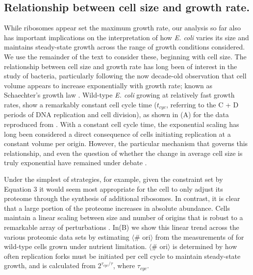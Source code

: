 \subsection{Relationship between cell size and growth rate.}

While ribosomes appear set the maximum growth rate, our analysis so far also has
important implications on the interpretation of how \textit{E. coli} varies its
size and maintains steady-state growth across the range of growth conditions
considered. We use the remainder of the text to consider these, beginning with
cell size.
The relationship between cell size and growth rate has long been of interest in
the study of bacteria, particularly following the now decade-old observation
that cell volume appears to increase exponentially with growth rate; known as
Schaechter's growth law  \citep{schaechter1958, taheriaraghi2015}. Wild-type
\textit{E. coli} growing at relatively fast growth rates, show a remarkably
constant cell cycle time ($t_{cyc}$, referring to the C + D periods of DNA
replication and cell division), as shown in (A) for
the data reproduced from \citep{si2017}. With a constant cell cycle time, the
exponential scaling has long been considered a direct consequence of cells
initiating replication at a constant volume per origin. However, the particular
mechanism that governs this relationship, and even the question of whether the
change in average cell size is truly exponential  have remained under debate
\citep{si2017, harris2018}.

Under the simplest of strategies, for example, given the constraint set by
Equation 3 it would seem most appropriate for the cell to only adjust its
proteome through the synthesis of additional ribosomes. In contrast, it is clear
that a large portion of the proteome increases in absolute abundance. Cells
maintain a linear scaling between size and number of origins that is robust to a
remarkable array of perturbations \citep{si2017}.
In(B) we show this linear trend across the various
proteomic data sets by estimating $\langle$\# ori$\rangle$ from the measurements
of \cite{si2017} for wild-type cells grown under nutrient limitation.
$\langle$\# ori$\rangle$ is determined by how often replication forks must be
initiated per cell cycle to maintain steady-state growth, and is calculated from
2$^{\tau_{cyc} / \tau}$, where $\tau_{cyc}$.

